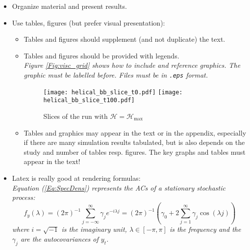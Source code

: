 \begin{itemize}

    \item Organize material and present results.

    \item Use tables, figures (but prefer visual presentation):
        \begin{itemize}
            \item Tables and figures should supplement (and not duplicate) the
                text.

            \item Tables and figures should be provided with
            legends.\\
                \textit{ Figure \ref{Fig:visc_grid} shows how to include and reference
                graphics. The graphic must be labelled before. Files must be in
                \texttt{.eps} format.}

                \begin{figure}[ht]
		  \centering
		  {\texttt{[image: helical\_bb\_slice\_t0.pdf]}}
		  {\texttt{[image: helical\_bb\_slice\_t100.pdf]}}
                    \label{Fig:helical}
                  \caption{Slices of the run with $\mathcal{H}=\mathcal{H}_\textrm{max}$}
                \end{figure}

            \item Tables and graphics may appear in the text or in
                the appendix, especially if there are many simulation results
                tabulated, but is also depends on the study and number of tables resp.
                figures. The key graphs and tables must appear in
                the text!
        \end{itemize}

    \item Latex is really good at rendering formulas:\\
        \textit{Equation (\ref{Eq:SpecDens}) represents the ACs of a stationary
        stochastic process:
        \begin{equation}
            f_y(\lambda) = (2\pi)^{-1} \sum_{j=-\infty}^{\infty}
                           \gamma_j e^{-i\lambda j}
                         =(2\pi)^{-1}\left(\gamma_0 + 2 \sum_{j=1}^{\infty}
        \gamma_j \cos(\lambda j)\right)
                                        \label{Eq:SpecDens}
        \end{equation}
        where $i=\sqrt{-1}$ is the imaginary unit, $\lambda \in [-\pi,
        \pi]$ is the frequency and the $\gamma_j$ are the autocovariances
        of $y_t$.}


\end{itemize}

